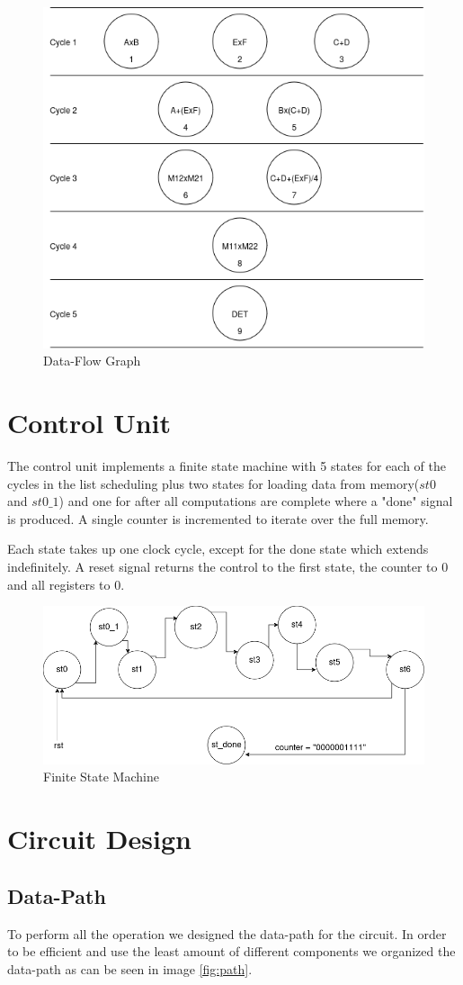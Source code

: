 \documentclass[12pt]{article}
\begin{document}
\begin{figure}[H]
	\centering
	\includegraphics[width=0.55\linewidth]{Imagens/stop.drawio.png}
	\caption{Data-Flow Graph}
	\label{fig:sch}
\end{figure}

\section{Control Unit}
The control unit implements a finite state machine with 5 states for each of the cycles in the list scheduling plus two states for loading data from memory($st0$ and $st0\_1$) and one for after all computations are complete where a "done" signal is produced. A single counter is incremented to iterate over the full memory.

Each state takes up one clock cycle, except for the done state which extends indefinitely. A reset signal returns the control to the first state, the counter to 0 and all registers to 0.

\begin{figure}[H]
	\centering
	\includegraphics[width=0.55\linewidth]{images/FSM_lab2.drawio.png}
	\caption{Finite State Machine}
	\label{fig:fsm}
\end{figure}

\section{Circuit Design}
\subsection{Data-Path}
To perform all the operation we designed the data-path for the circuit. In order to be efficient and use the least amount of different components we organized the data-path as can be seen in image \ref{fig:path}. 
\end{document}
